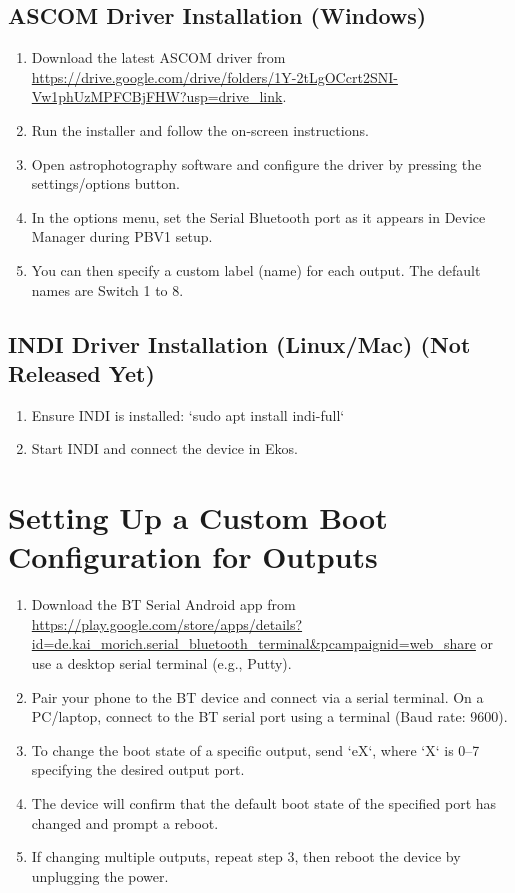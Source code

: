 \documentclass[a4paper,10pt,twocolumn]{article}
\begin{document}
\subsection*{ASCOM Driver Installation (Windows)}
\begin{enumerate}
    \item Download the latest ASCOM driver from \url{https://drive.google.com/drive/folders/1Y-2tLgOCcrt2SNI-Vw1phUzMPFCBjFHW?usp=drive_link}.
    \item Run the installer and follow the on-screen instructions.
    \item Open astrophotography software and configure the driver by pressing the settings/options button.
    \item In the options menu, set the Serial Bluetooth port as it appears in Device Manager during PBV1 setup.
    \item You can then specify a custom label (name) for each output. The default names are Switch 1 to 8.
\end{enumerate}

\subsection*{INDI Driver Installation (Linux/Mac) (Not Released Yet)}
\begin{enumerate}
    \item Ensure INDI is installed: `sudo apt install indi-full`
    \item Start INDI and connect the device in Ekos.
\end{enumerate}

\section*{Setting Up a Custom Boot Configuration for Outputs}
\begin{enumerate}
    \item Download the BT Serial Android app from \url{https://play.google.com/store/apps/details?id=de.kai_morich.serial_bluetooth_terminal&pcampaignid=web_share} or use a desktop serial terminal (e.g., Putty).
    \item Pair your phone to the BT device and connect via a serial terminal. On a PC/laptop, connect to the BT serial port using a terminal (Baud rate: 9600).
    \item To change the boot state of a specific output, send `eX`, where `X` is 0–7 specifying the desired output port.
    \item The device will confirm that the default boot state of the specified port has changed and prompt a reboot.
    \item If changing multiple outputs, repeat step 3, then reboot the device by unplugging the power.
\end{enumerate}
\end{document}
